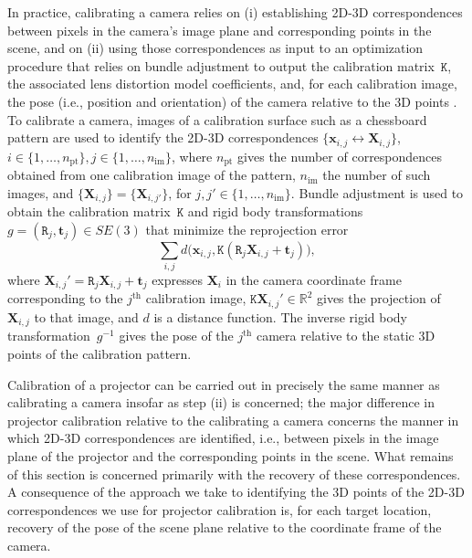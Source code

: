 \documentclass[review]{elsarticle}
\begin{document}
In practice, calibrating a camera relies on (i) establishing 2D-3D correspondences between pixels in the camera's image plane and corresponding points in the scene, and on (ii) using those correspondences as input to an optimization procedure that relies on bundle adjustment \cite{triggs1999bundle} to output the calibration matrix~$\mathtt{K}$, the associated lens distortion model coefficients, and, for each calibration image, the pose (i.e., position and orientation) of the camera relative to the 3D points \cite{Hartley2004,zhang2000flexible}. To calibrate a camera, images of a calibration surface such as a chessboard pattern are used to identify the 2D-3D correspondences $\{\mathbf{x}_{i,j} \leftrightarrow \mathbf{X}_{i,j}\}$, $i \in \{ 1, \dots, n_\text{pt} \}, j \in \{ 1, \dots, n_\text{im} \}$, where $n_\text{pt}$ gives the number of correspondences obtained from one calibration image of the pattern, $n_\text{im}$ the number of such images, and $\{\mathbf{X}_{i,j}\} = \{\mathbf{X}_{i,j'}\}$, for $j, j' \in \{ 1, \dots, n_\text{im} \}$. Bundle adjustment is used to obtain the calibration matrix~$\mathtt{K}$ and rigid body transformations $g = (\mathtt{R}_j, \mathbf{t}_j) \in SE(3)$ that minimize the reprojection error
\begin{equation}
\sum_{i,j} d\big(\mathbf{x}_{i,j}, \mathtt{K}(\mathtt{R}_j\mathbf{X}_{i,j} + \mathbf{t}_j)\big),
\label{re}
\end{equation}
where $\mathbf{X}_{i,j}' = \mathtt{R}_j\mathbf{X}_{i,j} + \mathbf{t}_j$ expresses $\mathbf{X}_i$ in the camera coordinate frame corresponding to the $j^{\text{th}}$ calibration image, $\mathtt{K}\mathbf{X}_{i,j}' \in \mathbb{R}^2$ gives the projection of $\mathbf{X}_{i,j}$ to that image, and $d$ is a distance function. The inverse rigid body transformation~$g^{-1}$ gives the pose of the $j^{\text{th}}$ camera relative to the static 3D points of the calibration pattern.

Calibration of a projector can be carried out in precisely the same manner as calibrating a camera insofar as step (ii) is concerned; the major difference in projector calibration relative to the calibrating a camera concerns the manner in which 2D-3D correspondences are identified, i.e., between pixels in the image plane of the projector and the corresponding points in the scene. What remains of this section is concerned primarily with the recovery of these correspondences. A consequence of the approach we take to identifying the 3D points of the 2D-3D correspondences we use for projector calibration is, for each target location, recovery of the pose of the scene plane relative to the coordinate frame of the camera.
\end{document}
